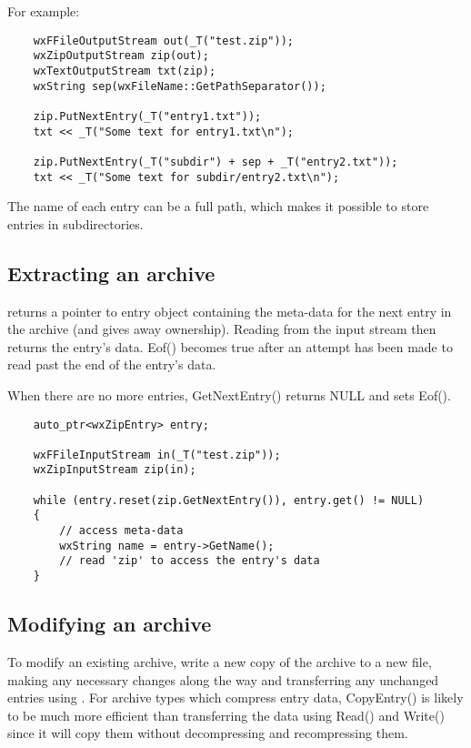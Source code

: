For example:

\begin{verbatim}
    wxFFileOutputStream out(_T("test.zip"));
    wxZipOutputStream zip(out);
    wxTextOutputStream txt(zip);
    wxString sep(wxFileName::GetPathSeparator());

    zip.PutNextEntry(_T("entry1.txt"));
    txt << _T("Some text for entry1.txt\n");

    zip.PutNextEntry(_T("subdir") + sep + _T("entry2.txt"));
    txt << _T("Some text for subdir/entry2.txt\n");

\end{verbatim}

The name of each entry can be a full path, which makes it possible to
store entries in subdirectories.


\subsection{Extracting an archive}\label{wxarcextract}


 returns a pointer
to entry object containing the meta-data for the next entry in the archive
(and gives away ownership). Reading from the input stream then returns the
entry's data. Eof() becomes true after an attempt has been made to read past
the end of the entry's data.

When there are no more entries, GetNextEntry() returns NULL and sets Eof().

\begin{verbatim}
    auto_ptr<wxZipEntry> entry;

    wxFFileInputStream in(_T("test.zip"));
    wxZipInputStream zip(in);

    while (entry.reset(zip.GetNextEntry()), entry.get() != NULL)
    {
        // access meta-data
        wxString name = entry->GetName();
        // read 'zip' to access the entry's data
    }

\end{verbatim}


\subsection{Modifying an archive}\label{wxarcmodify}


To modify an existing archive, write a new copy of the archive to a new file,
making any necessary changes along the way and transferring any unchanged
entries using .
For archive types which compress entry data, CopyEntry() is likely to be
much more efficient than transferring the data using Read() and Write()
since it will copy them without decompressing and recompressing them.

